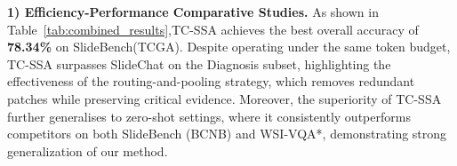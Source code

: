 \documentclass[runningheads]{llncs}
\begin{document}



\noindent\textbf{1) Efficiency-Performance Comparative Studies.}
As shown in Table~\ref{tab:combined_results},\textsc{TC-SSA} achieves the best overall accuracy of \textbf{78.34\%} on SlideBench(TCGA). 
Despite operating under the same token budget, \textsc{TC-SSA} surpasses SlideChat on the Diagnosis subset, highlighting the effectiveness of the routing-and-pooling strategy, which removes redundant patches while preserving critical evidence.
Moreover, the superiority of \textsc{TC-SSA} further generalises to zero-shot settings, where it consistently outperforms competitors on both SlideBench (BCNB) and WSI-VQA*, demonstrating strong generalization of our method.
\end{document}
